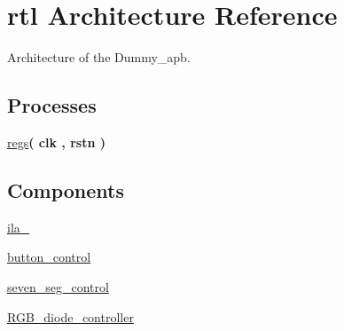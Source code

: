 \hypertarget{classbutton__and__hex__wrapper_1_1rtl}{\section{rtl Architecture Reference}
\label{classbutton__and__hex__wrapper_1_1rtl}
}


Architecture of the Dummy\-\_\-apb.  


\subsection*{Processes}
 \begin{DoxyCompactItemize}
\item 
\hypertarget{classbutton__and__hex__wrapper_1_1rtl_a7b544993da64c8f112760250ae38b7cd}{\hyperlink{classbutton__and__hex__wrapper_1_1rtl_a7b544993da64c8f112760250ae38b7cd}{regs}{\bfseries  ( {\bfseries \textcolor{vhdlchar}{clk}\textcolor{vhdlchar}{ }\textcolor{vhdlchar}{ }\textcolor{vhdlchar}{ }} , {\bfseries \textcolor{vhdlchar}{rstn}\textcolor{vhdlchar}{ }} )}}\label{classbutton__and__hex__wrapper_1_1rtl_a7b544993da64c8f112760250ae38b7cd}

\end{DoxyCompactItemize}
\subsection*{Components}
 \begin{DoxyCompactItemize}
\item 
\hypertarget{classbutton__and__hex__wrapper_1_1rtl_afa612c9c55ff111b546e19ee46f8a3a3}{\hyperlink{classbutton__and__hex__wrapper_1_1rtl_afa612c9c55ff111b546e19ee46f8a3a3}{ila\-\_}  {\bfseries }  }\label{classbutton__and__hex__wrapper_1_1rtl_afa612c9c55ff111b546e19ee46f8a3a3}

\item 
\hypertarget{classbutton__and__hex__wrapper_1_1rtl_a2f192fc88cf30c3a81528c3bec449d7c}{\hyperlink{classbutton__and__hex__wrapper_1_1rtl_a2f192fc88cf30c3a81528c3bec449d7c}{button\-\_\-control}  {\bfseries }  }\label{classbutton__and__hex__wrapper_1_1rtl_a2f192fc88cf30c3a81528c3bec449d7c}

\item 
\hypertarget{classbutton__and__hex__wrapper_1_1rtl_ab9483222d3cb1f8d2e2d5b9f7b050991}{\hyperlink{classbutton__and__hex__wrapper_1_1rtl_ab9483222d3cb1f8d2e2d5b9f7b050991}{seven\-\_\-seg\-\_\-control}  {\bfseries }  }\label{classbutton__and__hex__wrapper_1_1rtl_ab9483222d3cb1f8d2e2d5b9f7b050991}

\item 
\hypertarget{classbutton__and__hex__wrapper_1_1rtl_a4bd7f19e51dcb73ce4329b7ea3129132}{\hyperlink{classbutton__and__hex__wrapper_1_1rtl_a4bd7f19e51dcb73ce4329b7ea3129132}{R\-G\-B\-\_\-diode\-\_\-controller}  {\bfseries }  }\label{classbutton__and__hex__wrapper_1_1rtl_a4bd7f19e51dcb73ce4329b7ea3129132}

\end{DoxyCompactItemize}
